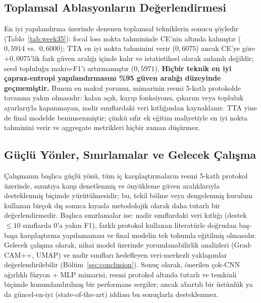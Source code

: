\subsection{Toplamsal Ablasyonların Değerlendirmesi}
\label{subsec:disc-week35}
En iyi yapılandırma üzerinde denenen toplamsal tekniklerin sonucu şöyledir
(Tablo~\ref{tab:week35}): focal loss nokta tahmininde CE'nin
altında kalmıştır ($0{,}5914$ vs.\ $0{,}6000$); TTA en iyi nokta tahminini verir
($0{,}6075$) ancak CE'ye göre $+0{,}0075$'lik fark güven aralığı içinde kalır ve
istatistiksel olarak anlamlı değildir; seed topluluğu makro-F1'i artırmamıştır
($0{,}5971$). \textbf{Hiçbir teknik en iyi çapraz-entropi yapılandırmasını \%95
güven aralığı düzeyinde geçmemiştir.} Bunun en makul yorumu, mimarinin resmi
5-katlı protokolde
tavanına yakın olmasıdır: kalan açık, kayıp fonksiyonu, çıkarım veya topluluk
ayarlarıyla kapanmayan, nadir sınıflardaki veri kıtlığından kaynaklanır. TTA yine
de final modelde benimsenmiştir; çünkü sıfır ek eğitim maliyetiyle en iyi nokta
tahminini verir ve aggregate metrikleri hiçbir zaman düşürmez.

\subsection{Güçlü Yönler, Sınırlamalar ve Gelecek Çalışma}
\label{subsec:disc-strengths}
Çalışmanın başlıca güçlü yönü, tüm iç karşılaştırmaların resmi 5-katlı protokol
üzerinde, sızıntıya karşı denetlenmiş ve önyükleme güven aralıklarıyla
desteklenmiş biçimde yürütülmesidir; bu, tekil bölme veya dengelenmiş kurulum
kullanan birçok dış sonuca kıyasla metodolojik olarak daha tutarlı bir
değerlendirmedir. Başlıca sınırlamalar ise: nadir sınıflardaki veri kıtlığı
(destek $\le 10$ sınıflarda $0$'a yakın F1), farklı protokol kullanan literatürle
doğrudan baş-başa karşılaştırma yapılamaması ve final modelin tek tohumla
eğitilmiş olmasıdır. Gelecek çalışma olarak, nihai model üzerinde
yorumlanabilirlik analizleri (Grad-CAM++, UMAP) ve nadir sınıfları hedefleyen
veri-merkezli yaklaşımlar değerlendirilebilir (Bölüm~\ref{sec:conclusion}).
Sonuç olarak, önerilen çok-CNN ağırlıklı füzyon + MLP mimarisi, resmi protokol
altında tutarlı ve temkinli biçimde konumlandırılmış bir performans sergiler;
ancak
abartılı bir üstünlük ya da güncel-en-iyi (state-of-the-art) iddiası bu
sonuçlarla desteklenmez.
